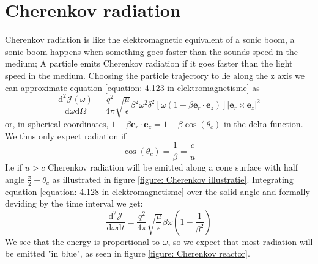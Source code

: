 \documentclass[11pt,a4paper,faculty=we,language=en,doctype=report]{cls/ugent-doc}
\begin{document}
\section{Cherenkov radiation}
Cherenkov radiation is like the elektromagnetic equivalent of a sonic boom, a sonic boom happens when something goes faster than the sounds speed in the medium; A particle emits Cherenkov radiation if it goes faster than the light speed in the medium. Choosing the particle trajectory to lie along the z axis we can approximate equation \ref{equation: 4.123 in elektromagnetisme} as
\begin{equation}
	\frac{\text{d}^2 \mathscr{J}(\omega)}{\text{d} \omega \text{d} \Omega} = \frac{q^2}{4\pi}\sqrt{\frac{\mu}{\epsilon}}\beta^2\omega^2\delta^2[\omega(1-\beta \mathbf{e}_r\cdot\mathbf{e}_z)]|\mathbf{e}_r\times\mathbf{e}_z|^2 \label{equation: 4.128 in elektromagnetisme}
\end{equation}
or, in spherical coordinates, $1-\beta \mathbf{e}_r\cdot\mathbf{e}_z = 1-\beta\cos(\theta_c)$ in the delta function. We thus only expect radiation if
\begin{equation}
	\cos(\theta_c) = \frac{1}{\beta} = \frac{c}{u}
\end{equation}
I.e if $u>c$ Cherenkov radiation will be emitted along a cone surface with half angle $\frac{\pi}{2}-\theta_c$ as illustrated in figure \ref{figure: Cherenkov illustratie}. Integrating equation \ref{equation: 4.128 in elektromagnetisme} over the solid angle and formally deviding by the time interval we get:
\begin{equation}
	\frac{\text{d}^2\mathscr{J}}{\text{d}\omega \text{d}t} = \frac{q^2}{4\pi}\sqrt{\frac{\mu}{\epsilon}}\beta\omega\left(1-\frac{1}{\beta^2}\right)	
\end{equation}
We see that the energy is proportional to $\omega$, so we expect that most radiation will be emitted "in blue", as seen in figure \ref{figure: Cherenkov reactor}.
\end{document}
